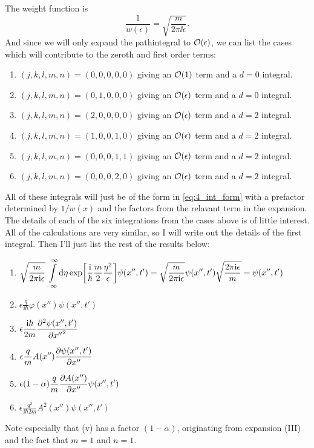 \documentclass[11pt,letter, swedish, english
]{article}
\begin{document}
The weight function is
\begin{equation}
\frac{1}{w(\epsilon)}=\sqrt{\frac{m}{2\pi\ii\epsilon}}.
\end{equation}
And since we will only expand the pathintegral to $\order{\epsilon}$,
we can list the cases which will contribute to the zeroth and first
order terms:
\begin{enumerate}[label=(\roman*)]
\item $(j, k, l, m, n)=(0, 0, 0, 0, 0)$ giving an $\order{1}$ term and a
$d=0$ integral. 
\item $(j, k, l, m, n)=(0, 1, 0, 0, 0)$ giving an $\order{\epsilon}$ term
and a $d=0$ integral. 
\item $(j, k, l, m, n)=(2, 0, 0, 0, 0)$ giving an $\order{\epsilon}$ term
and a $d=2$ integral.
\item $(j, k, l, m, n)=(1, 0, 0, 1, 0)$ giving an $\order{\epsilon}$ term
and a $d=2$ integral.
\item $(j, k, l, m, n)=(0, 0, 0, 1, 1)$ giving an $\order{\epsilon}$ term
and a $d=2$ integral.
\item $(j, k, l, m, n)=(0, 0, 0, 2, 0)$ giving an $\order{\epsilon}$ term
and a $d=2$ integral. 
\end{enumerate}
All of these integrals will just be of the form in
\eqref{eq:4_int_form} with a prefactor determined by $1/w(x)$ and the
factors from the relavant term in the expansion. The details of each
of the six integrations from the cases above is of little
interest. All of the calculations are very similar, so I will write
out the details of the first integral. Then I'll just list the rest of
the results below:
\begin{enumerate}[label=(\roman*)]
\item $\displaystyle
\sqrt{\frac{m}{2\pi\ii\epsilon}} \int_{-\infty}^{\infty}\!\rd{\eta}
\exp[\frac{\ii}{\hbar}\frac{m}{2}\frac{\eta^2}{\epsilon}]
\psi(x'', t')
=\sqrt{\frac{m}{2\pi\ii\epsilon}}\psi(x'', t')
\sqrt{\frac{2\pi\ii\epsilon}{m}}
=\psi(x'', t')
$
\item $\displaystyle
\epsilon\frac{q}{\ii\hbar}\varphi(x'')\psi(x'', t')
$
\item $\displaystyle
\epsilon\frac{\mathrm{i}\hbar}{2m}\pdv[2]{\psi(x'', t')}{{x''}}
$
\item $\displaystyle
\epsilon\frac{q}{m}A(x'')\pdv{\psi(x'', t')}{x''}
$
\item $\displaystyle
\epsilon(1-\alpha)\frac{q}{m}\pdv{A(x'')}{x''}\psi(x'', t')
$
\item $\displaystyle
\epsilon\frac{q^2}{\ii\hbar2m}A^2(x'')\psi(x'', t')
$
\end{enumerate}
Note especially that (v) has a factor $(1-\alpha)$, originating from
expansion (III) and the fact that $m=1$ and $n=1$.
\end{document}
